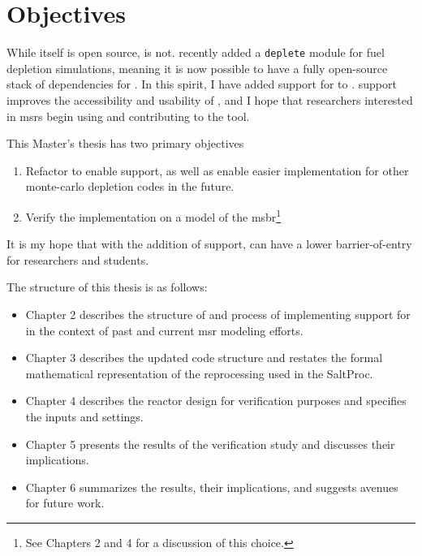\section{Objectives}%
\label{sec:objectives}

While \SaltProc itself is open source, \SerpentTWO is not. \OpenMC recently
added a \verb.deplete. module for fuel depletion simulations, meaning it is now
possible to have a fully open-source stack of dependencies for \SaltProc.
In this spirit, I have added support for \OpenMC to \SaltProc. \OpenMC support improves
the accessibility and usability of \SaltProc, and I hope that researchers
interested in \Gls{msr}s begin using and contributing to the tool.

This Master's thesis has two primary objectives
\begin{enumerate}
    \item Refactor \SaltProc to enable \OpenMC support, as well as enable
        easier implementation for other monte-carlo depletion codes in the
        future. 
    \item Verify the implementation on a model of the \Gls{msbr}\footnote{See
        Chapters 2 and 4 for a discussion of this choice.}
\end{enumerate}

It is my hope that with the addition of \OpenMC support, \SaltProc can have a
lower barrier-of-entry for researchers and students. 

The structure of this thesis is as follows:
\begin{itemize}
    \item Chapter 2 describes the structure of \SaltProc and process of
        implementing support for \OpenMC in the context of past and current
        \Gls{msr} modeling efforts.
    \item Chapter 3 describes the updated code structure and restates the
        formal mathematical representation of the reprocessing used in the
        SaltProc.
    \item Chapter 4 describes the reactor design for verification purposes and
        specifies the inputs and settings.
    \item Chapter 5 presents the results of the verification study and
        discusses their implications.
    \item Chapter 6 summarizes the results, their implications, and suggests
        avenues for future work.
\end{itemize}

